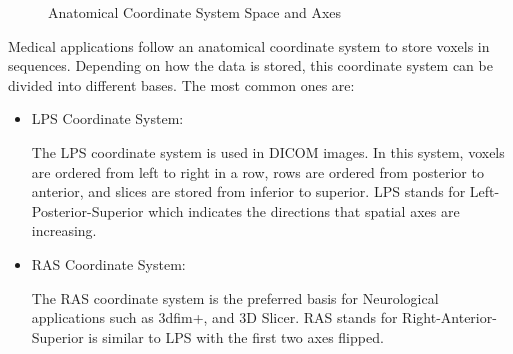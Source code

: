 \documentclass[12pt]{article}
\begin{document}
\begin{figure}[H] 
\centering
{}%
%
\caption{Anatomical Coordinate System Space and Axes~\cite{slicerWCS}} %
\label{ACS}
\end{figure}

\noindent Medical applications follow an anatomical coordinate system to store voxels in sequences. Depending on how the data is stored, this coordinate system can be divided into different bases. The most common ones are:
\begin{itemize}
\item{LPS Coordinate System:}

The LPS coordinate system is used in DICOM images. In this system, voxels are ordered from left to right in a row, rows are ordered from posterior to anterior, and slices are stored from inferior to superior.
\indent
LPS stands for Left-Posterior-Superior which indicates the directions that spatial axes are increasing.
\item{RAS Coordinate System:}

The RAS coordinate system is the preferred basis for Neurological applications such as 3dfim+, and 3D Slicer. RAS stands for Right-Anterior-Superior is similar to LPS with the first two axes flipped.
\end{itemize}
\end{document}
